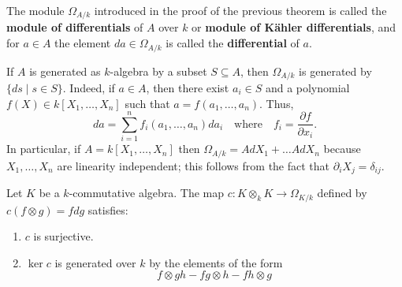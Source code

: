 \begin{definition}\label{def:module-of-differentials}
	The module $\Omega_{A/k}$ introduced in the proof of the previous theorem is called the \textbf{module of differentials} of $A$ over $k$ or \textbf{module of Kähler differentials}, and for $a \in A$ the element $da\in \Omega_{A/k}$ is called the \textbf{differential} of $a$.
\end{definition}
\begin{example}\label{ex:differentials-of-polynomials}
	If $A$ is generated as $k$-algebra by a subset $S \subseteq A$, then $\Omega_{A/k}$ is generated by $\{ds\mid s \in S\}$. Indeed, if $a \in A$, then there exist $a_{i}\in S$ and a polynomial $f(X) \in k[X_{1}, \ldots, X_{n}]$ such that $a = f(a_{1}, \ldots, a_{n})$. Thus,
	\[
		da = \sum_{i=1}^{n} f_{i}(a_{1}, \ldots, a_{n})da_{i} \quad \text{where}\quad f_{i} = \frac{\partial f}{\partial x_{i}}.
	\]
	In particular, if $A = k[X_{1}, \ldots, X_{n}]$ then $\Omega_{A/k} = A dX_{1} + \ldots A dX_{n}$ because $X_{1}, \ldots, X_{n}$ are linearity independent; this follows from the fact that $\partial_{i} X_{j} = \delta_{ij}$.
\end{example}
\begin{lemma}\label{lemm:c-map-differentials}
	Let $K$ be a $k$-commutative algebra. The map $c\colon K \otimes_{k} K \to \Omega_{K/k}$ defined by $c(f \otimes g) = fdg$ satisfies:
	\begin{enumerate}[label = (\roman*)]
		\item $c$ is surjective.
		\item $\ker c$ is generated over $k$ by the elements of the form
		\[
			f \otimes gh - fg \otimes h - fh \otimes g
		\]
	\end{enumerate}
\end{lemma}
